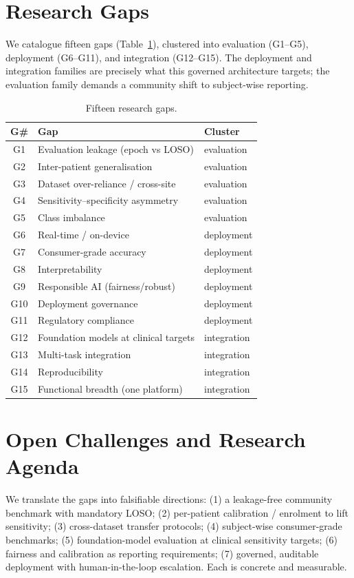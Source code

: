 \documentclass[10pt,journal,twocolumn]{IEEEtran}
\begin{document}
\section{Research Gaps}
We catalogue fifteen gaps (Table~\ref{tab:gaps}), clustered into evaluation (G1--G5), deployment (G6--G11), and integration (G12--G15). The deployment and integration families are precisely what this governed architecture targets; the evaluation family demands a community shift to subject-wise reporting.
\begin{table}[h]\centering\caption{Fifteen research gaps.}\label{tab:gaps}
\footnotesize\begin{tabular}{cll}\toprule
G\# & Gap & Cluster\\\midrule
G1 & Evaluation leakage (epoch vs LOSO) & evaluation\\
G2 & Inter-patient generalisation & evaluation\\
G3 & Dataset over-reliance / cross-site & evaluation\\
G4 & Sensitivity--specificity asymmetry & evaluation\\
G5 & Class imbalance & evaluation\\
G6 & Real-time / on-device & deployment\\
G7 & Consumer-grade accuracy & deployment\\
G8 & Interpretability & deployment\\
G9 & Responsible AI (fairness/robust) & deployment\\
G10 & Deployment governance & deployment\\
G11 & Regulatory compliance & deployment\\
G12 & Foundation models at clinical targets & integration\\
G13 & Multi-task integration & integration\\
G14 & Reproducibility & integration\\
G15 & Functional breadth (one platform) & integration\\\bottomrule
\end{tabular}\end{table}

\section{Open Challenges and Research Agenda}
We translate the gaps into falsifiable directions: (1) a leakage-free community benchmark with mandatory LOSO; (2) per-patient calibration / enrolment to lift sensitivity; (3) cross-dataset transfer protocols; (4) subject-wise consumer-grade benchmarks; (5) foundation-model evaluation at clinical sensitivity targets; (6) fairness and calibration as reporting requirements; (7) governed, auditable deployment with human-in-the-loop escalation. Each is concrete and measurable.
\end{document}
